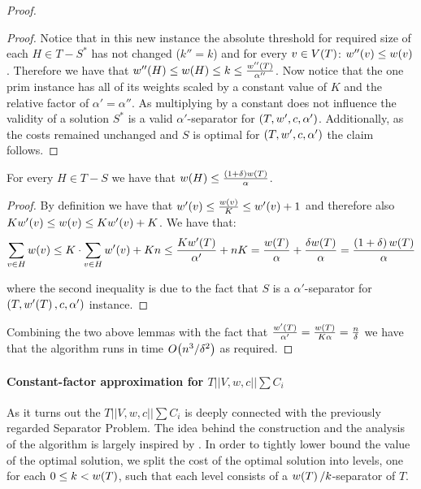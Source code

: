 \begin{theorem}
\begin{proof}
\begin{lemma}
\begin{proof}
                Notice that in this new instance the absolute threshold for required size of each $H \in T-S^*$ has not changed ($k'' = k$) and for every $v\in V\mathopen{}\left( T \right)$: $w''\mathopen{}\left( v \right)\leq w\mathopen{}\left( v \right)$.  Therefore we have that $w''\mathopen{}\left( H \right)\leq w\mathopen{}\left( H \right)\leq k\leq \frac{w''\mathopen{}\left( T \right)}{\alpha''}$. Now notice that the one prim instance has all of its weights scaled by a constant value of $K$ and the relative factor of $\alpha' = \alpha''$. As multiplying by a constant does not influence the validity of a solution $S^*$ is a valid $\alpha'$-separator for $\mathopen{}\left( T, w', c, \alpha' \right)$. Additionally, as the costs remained unchanged and $S$ is optimal for $\mathopen{}\left( T, w', c, \alpha' \right)$ the claim follows.
            \end{proof}
        \end{lemma}
        \begin{lemma}
            For every $H\in T-S$ we have that $w\mathopen{}\left( H \right)\leq\frac{\mathopen{}\left( 1+\delta \right)w\mathopen{}\left( T \right)}{\alpha}$.
            \begin{proof}
                By definition we have that $w'\mathopen{}\left( v \right)\leq \frac{w\mathopen{}\left( v \right)}{K}\leq w'\mathopen{}\left( v \right)+1$ and therefore also $Kw'\mathopen{}\left( v \right)\leq w\mathopen{}\left( v \right)\leq Kw'\mathopen{}\left( v \right)+K$. We have that:
                $$
                \sum_{v\in H}w\mathopen{}\left( v \right)\leq K\cdot\sum_{v\in H}w'\mathopen{}\left( v \right)+Kn\leq \frac{Kw'\mathopen{}\left( T \right)}{\alpha'}+nK = \frac{w\mathopen{}\left( T \right)}{\alpha} + \frac{\delta w\mathopen{}\left( T \right)}{\alpha}=\frac{\mathopen{}\left( 1+\delta \right)w\mathopen{}\left( T \right)}{\alpha}
                $$
                
                where the second inequality is due to the fact that $S$ is a $\alpha'$-separator for $\mathopen{}\left( T, w'\mathopen{}\left( T \right), c, \alpha' \right)$ instance.
            \end{proof}
        \end{lemma}
        
        Combining the two above lemmas with the fact that $\frac{w'\mathopen{}\left( T \right)}{\alpha'}=\frac{w\mathopen{}\left( T \right)}{K\alpha}=\frac{n}{\delta}$ we have that the algorithm runs in time $O\mathopen{}\left( n^3/\delta^2 \right)$ as required.
    \end{proof}
\end{theorem}
\paragraph{Constant-factor approximation for $T||V, w, c||\sum C_i$}
    As it turns out the $T||V, w, c||\sum C_i$ is deeply connected with the previously regarded Separator Problem. The idea behind the construction and the analysis of the algorithm is largely inspired by \cite{Approximatehierarchicalclusteringviasparsestcutandspreadingmetrics}. In order to tightly lower bound the value of the optimal solution, we split the cost of the optimal solution into levels, one for each $0\leq k < w\mathopen{}\left( T \right)$, such that each level consists of a $w\mathopen{}\left( T \right)/k$-separator of $T$.
    
